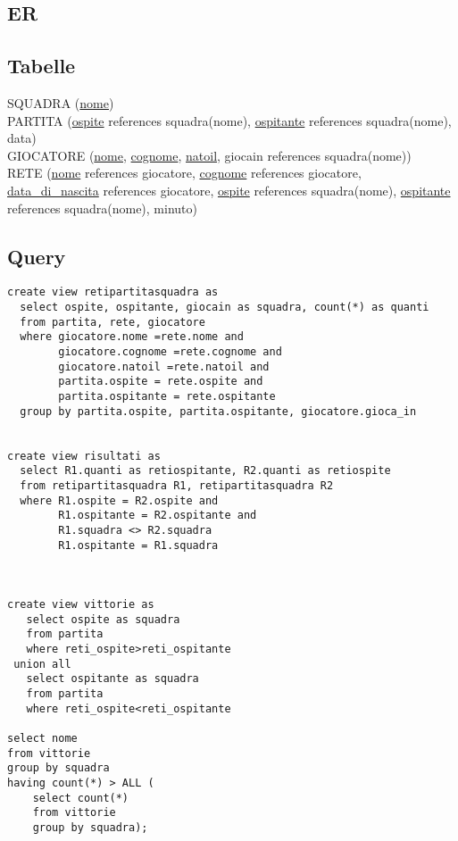 \documentclass[11pt]{article}
\begin{document}
\subsection{ER}
\begin{center}
\end{center}

\subsection{Tabelle}

\noindent
SQUADRA (\underline{nome})\\
PARTITA (\underline{ospite} references squadra(nome), \underline{ospitante} references
squadra(nome), data)\\
GIOCATORE (\underline{nome}, \underline{cognome}, \underline{natoil}, giocain references
squadra(nome))\\
RETE (\underline{nome} references giocatore, \underline{cognome} references giocatore,
\underline{data\_di\_nascita} references giocatore, \underline{ospite}
references squadra(nome), \underline{ospitante} references squadra(nome), minuto)

\subsection{Query}

\begin{verbatim}
create view retipartitasquadra as
  select ospite, ospitante, giocain as squadra, count(*) as quanti
  from partita, rete, giocatore
  where giocatore.nome =rete.nome and
        giocatore.cognome =rete.cognome and
        giocatore.natoil =rete.natoil and
        partita.ospite = rete.ospite and
        partita.ospitante = rete.ospitante
  group by partita.ospite, partita.ospitante, giocatore.gioca_in


create view risultati as
  select R1.quanti as retiospitante, R2.quanti as retiospite
  from retipartitasquadra R1, retipartitasquadra R2
  where R1.ospite = R2.ospite and
        R1.ospitante = R2.ospitante and
        R1.squadra <> R2.squadra
        R1.ospitante = R1.squadra



create view vittorie as
   select ospite as squadra
   from partita
   where reti_ospite>reti_ospitante
 union all
   select ospitante as squadra
   from partita
   where reti_ospite<reti_ospitante

select nome
from vittorie
group by squadra
having count(*) > ALL (
    select count(*)
    from vittorie
    group by squadra);
\end{verbatim}
\end{document}
